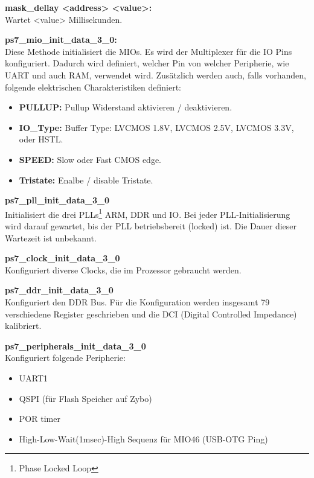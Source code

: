 \textbf{mask\_dellay <address> <value>:}\\
Wartet <value> Millisekunden.



\textbf{ps7\_mio\_init\_data\_3\_0:}\\
Diese Methode initialisiert die MIOs.
Es wird der Multiplexer für die IO Pins konfiguriert.
Dadurch wird definiert, welcher Pin von welcher Peripherie, wie UART und auch RAM, verwendet wird.
Zusätzlich werden auch, falls vorhanden, folgende elektrischen Charakteristiken definiert:
\begin{itemize}
\item \textbf{PULLUP:} Pullup Widerstand aktivieren / deaktivieren.
\item \textbf{IO\_Type:} Buffer Type: LVCMOS 1.8V, LVCMOS 2.5V, LVCMOS 3.3V,  oder HSTL.
\item \textbf{SPEED:} Slow oder Fast CMOS edge.
\item \textbf{Tristate:} Enalbe / disable Tristate.
\end{itemize} 


\textbf{ps7\_pll\_init\_data\_3\_0}\\
Initialisiert die drei PLLs\footnote{Phase Locked Loop} ARM, DDR und IO.
Bei jeder PLL-Initialisierung wird darauf gewartet, bis der PLL betriebsbereit (locked) ist.
Die Dauer dieser Wartezeit ist unbekannt.

\textbf{ps7\_clock\_init\_data\_3\_0}\\
Konfiguriert diverse Clocks, die im Prozessor gebraucht werden.

\textbf{ps7\_ddr\_init\_data\_3\_0}\\
Konfiguriert den DDR Bus.
Für die Konfiguration werden insgesamt 79 verschiedene Register geschrieben und die DCI (Digital Controlled Impedance) kalibriert.

\textbf{ps7\_peripherals\_init\_data\_3\_0}\\
Konfiguriert folgende Peripherie:
\begin{itemize}
\item UART1
\item QSPI (für Flash Speicher auf Zybo)
\item POR timer
\item High-Low-Wait(1msec)-High Sequenz für MIO46 (USB-OTG Ping)
\end{itemize}  




